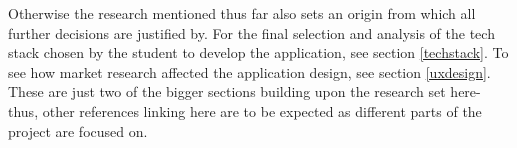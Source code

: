 Otherwise the research mentioned thus far also sets an origin from which all further decisions are justified by. For the final selection and analysis of the tech stack chosen by the student to develop the application, see section \ref{techstack}. To see how market research affected the application design, see section \ref{uxdesign}. These are just two of the bigger sections building upon the research set here- thus, other references linking here are to be expected as different parts of the project are focused on.


